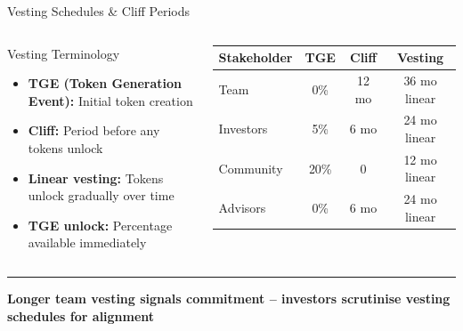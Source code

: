\documentclass[8pt,aspectratio=169]{beamer}
\newcommand{\bottomnote}[1]{\vfill\vspace{-2mm}\textcolor{mllavender2}{\rule{\textwidth}{0.4pt}}\vspace{1mm}\footnotesize\textbf{#1}}
\begin{document}
\begin{frame}{Vesting Schedules \& Cliff Periods}
\begin{columns}[T]
\begin{block}{Vesting Terminology}
\footnotesize
\begin{itemize}
  \item \textbf{TGE (Token Generation Event):} Initial token creation
  \item \textbf{Cliff:} Period before any tokens unlock
  \item \textbf{Linear vesting:} Tokens unlock gradually over time
  \item \textbf{TGE unlock:} Percentage available immediately
\end{itemize}
\end{block}
\vspace{2mm}
\footnotesize
\begin{tabular}{lccc}
\toprule
\textbf{Stakeholder} & \textbf{TGE} & \textbf{Cliff} & \textbf{Vesting} \\
\midrule
Team & 0\% & 12 mo & 36 mo linear \\
Investors & 5\% & 6 mo & 24 mo linear \\
Community & 20\% & 0 & 12 mo linear \\
Advisors & 0\% & 6 mo & 24 mo linear \\
\bottomrule
\end{tabular}

\end{columns}
\bottomnote{Longer team vesting signals commitment -- investors scrutinise vesting schedules for alignment}
\end{frame}
\end{document}
